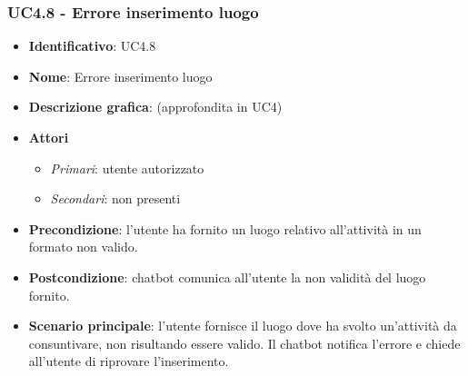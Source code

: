 \subsubsection{UC4.8 - Errore inserimento luogo}
\begin{itemize}
    \item \textbf{Identificativo}: UC4.8
    \item \textbf{Nome}: Errore inserimento luogo
    \item \textbf{Descrizione grafica}: (approfondita in UC4)
    \item \textbf{Attori}
        \begin{itemize} 
            \item \textit{Primari}: utente autorizzato
            \item \textit{Secondari}: non presenti
        \end{itemize}
    \item \textbf{Precondizione}: l'utente ha fornito un luogo relativo all'attività in un formato non valido. 
    \item \textbf{Postcondizione}: chatbot comunica all'utente la non validità del luogo fornito.
    \item \textbf{Scenario principale}: l'utente fornisce il luogo dove ha svolto un'attività da consuntivare, non risultando essere valido. Il chatbot notifica l'errore e chiede all'utente di riprovare l'inserimento. 
\end{itemize}
\newpage